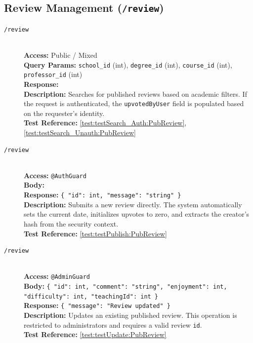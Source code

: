 \subsection{Review Management (\texttt{/review})}
\begin{description}
	\item[\GET \quad \texttt{/review}] \hfill \\
	\textbf{Access:} Public / Mixed \\
	\textbf{Query Params:} \texttt{school\_id} (int), \texttt{degree\_id} (int), \texttt{course\_id} (int), \texttt{professor\_id} (int) \\
	\textbf{Response:} \texttt{} \\
	\textbf{Description:} Searches for published reviews based on academic filters. If the request is authenticated, the \texttt{upvotedByUser} field is populated based on the requester's identity.\\
	\textbf{Test Reference:} \ref{test:testSearch_Auth:PubReview}, \ref{test:testSearch_Unauth:PubReview}
	
	\item[\POST \quad \texttt{/review}] \hfill \\
	\textbf{Access:} \texttt{@AuthGuard} \\
	\textbf{Body:} \texttt{} \\
	\textbf{Response:} \texttt{\{ "id": int, "message": "string" \}} \\
	\textbf{Description:} Submits a new review directly. The system automatically sets the current date, initializes upvotes to zero, and extracts the creator's hash from the security context.\\
	\textbf{Test Reference:} \ref{test:testPublish:PubReview}
	
	\item[\PUT \quad \texttt{/review}] \hfill \\
	\textbf{Access:} \texttt{@AdminGuard} \\
	\textbf{Body:} \texttt{\{ "id": int, "comment": "string", "enjoyment": int, "difficulty": int, "teachingId": int \}} \\
	\textbf{Response:} \texttt{\{ "message": "Review updated" \}} \\
	\textbf{Description:} Updates an existing published review. This operation is restricted to administrators and requires a valid review \texttt{id}.\\
	\textbf{Test Reference:} \ref{test:testUpdate:PubReview}
	

\end{description}
